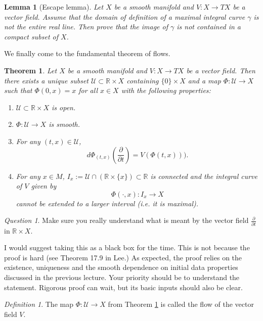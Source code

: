 \documentclass[12pt]{amsart}
\newtheorem{lemma}{Lemma}
\newtheorem{theorem}{Theorem}
\theoremstyle{remark}
\newtheorem{definition}{Definition}
\newtheorem{question}{Question}
\begin{document}
\begin{lemma}[Escape lemma]
Let $X$ be a smooth manifold and $V:X\to TX$ be a vector field. Assume that the domain of definition of a maximal integral curve $\gamma$ is not the entire real line. Then prove that the image of $\gamma$ is not contained in a compact subset of $X$.
\end{lemma}

We finally come to the fundamental theorem of flows.

\begin{theorem}\label{flowthm}Let $X$ be a smooth manifold and $V:X\to TX$ be a vector field. Then there exists a unique  subset $\mathcal{U}\subset \mathbb{R}\times X$ containing $\{0\}\times X$ and a map $\Phi: \mathcal{U}\to X$ such that $\Phi(0,x)=x$ for all $x\in X$ with the following properties:

\begin{enumerate}
\item $\mathcal{U}\subset \mathbb{R}\times X$ is open.
\item $\Phi: \mathcal{U}\to X$ is smooth.
\item For any $(t,x)\in \mathcal{U}$, $$d\Phi_{(t,x)}\left(\frac{\partial}{\partial t}\right)=V(\Phi(t,x))).$$
\item For any $x\in M$, $I_x:=\mathcal{U}\cap (\mathbb{R}\times\{x\})\subset \mathbb{R}$ is connected and the integral curve of $V$ given by $$\Phi(\cdot,x):I_x\to X$$ cannot be extended to a larger interval (i.e. it is maximal).
\end{enumerate}

\end{theorem}

\begin{question}Make sure you really understand what is meant by the vector field $\frac{\partial}{\partial t}$ in $\mathbb{R}\times X$. 
\end{question}

I would suggest taking this as a black box for the time. This is not because the proof is hard (see Theorem 17.9 in Lee.) As expected, the proof relies on the existence, uniqueness and the smooth dependence on initial data properties discussed in the previous lecture. Your priority should be to understand the statement. Rigorous proof can wait, but its basic inputs should also be clear.

\begin{definition}
The map $\Phi:\mathcal{U}\to X$ from Theorem \ref{flowthm} is called the flow of the vector field $V$.
\end{definition}
\end{document}
